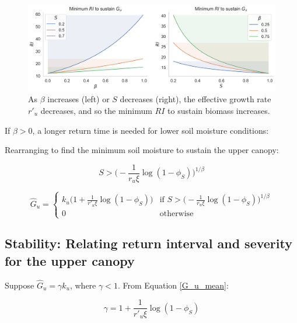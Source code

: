 \documentclass{article}
\begin{document}
\begin{figure}[h]
 \centering
  \includegraphics[width=33pc]{../fire_plots/stability_min_RI.png}
 \caption{ As $\beta$ increases (left) or $S$ decreases (right), the effective growth rate $r'_u$ decreases, and so the minimum $RI$ to sustain biomass increases. }
 \label{fig:stability_min_RI.png}
 \end{figure}
 
        
If $\beta>0$, a longer return time is needed for lower soil moisture conditions:


Rearranging to find the minimum soil moisture to sustain the upper canopy:

\begin{equation}
S > \bigg( - \frac{1}{r_u \xi }\log (1 - \phi_S)\bigg)^{1/\beta}
\end{equation}

\begin{equation}
\hat{G}_u  =
    \begin{cases}
       k_u \big( 1 + \frac{1}{r'_u \xi} \log(1-\phi_S) \big)
	  & \text{if  } S > \big( - \frac{1}{r_u \xi }\log (1 - \phi_S)\big)^{1/\beta}
		\\[10pt]
      0 & \text{otherwise}
    \end{cases}
\end{equation}



\subsection{Stability: Relating return interval and severity for the upper canopy}
        
        Suppose $\hat G_u = \gamma k_u$, where $\gamma<1$. From  Equation \ref{G_u_mean}:
        
        \begin{equation}
        \gamma =  1 + \frac{1}{r'_u \xi} \log(1-\phi_S)
        \end{equation}
        
\end{document}
